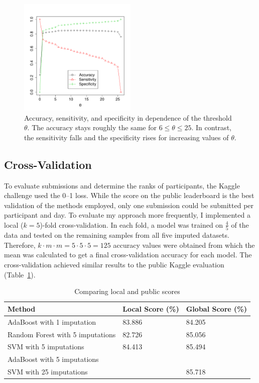 \documentclass[a4paper,11pt]{article}
\begin{document}
\begin{figure}[h]
  \centering
  \includegraphics[width=0.5\textwidth]{../Python/theta}
  \caption{Accuracy, sensitivity, and specificity in dependence of the
    threshold $\theta$. The accuracy stays roughly the same for
    $6 \leq \theta \leq 25$. In contrast, the sensitivity falls and
    the specificity rises for increasing values of $\theta$.}
  \label{fig:tuning}
\end{figure}


\subsection{Cross-Validation}
\label{sec:cross}

To evaluate submissions and determine the ranks of participants, the
Kaggle challenge used the 0--1 loss. While the score on the public
leaderboard is the best validation of the methods employed, only one
submission could be submitted per participant and day. To evaluate my
approach more frequently, I implemented a local ($k = 5$)-fold
cross-validation. In each fold, a model was trained on $\frac{4}{5}$
of the data and tested on the remaining samples from all five imputed
datasets. Therefore, $k \cdot m \cdot m = 5 \cdot 5 \cdot 5 = 125$
accuracy values were obtained from which the mean was calculated to
get a final cross-validation accuracy for each model. The
cross-validation achieved similar results to the public Kaggle
evaluation (Table~\ref{tab:localpublic}).

\begin{table}[h]
  \centering
  \begin{tabular}{lll}
    \toprule
    Method & Local Score (\%) & Global Score (\%)\\
    \midrule
    AdaBoost with 1 imputation & 83.886 & 84.205\\
    Random Forest with 5 imputations & 82.726 & 85.056\\
    SVM with 5 imputations & 84.413 & 85.494\\
    AdaBoost with 5 imputations & & \\
    SVM with 25 imputations &  & 85.718\\
    \bottomrule
  \end{tabular}
  \caption{{Comparing local and public scores}}
  \label{tab:localpublic}
\end{table}
\end{document}
